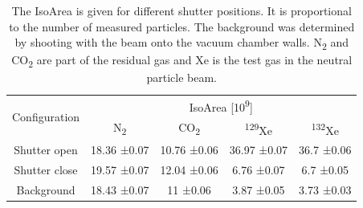 	
	
	\begin{table}
		\begin{center}
			\begin{tabular}{|c|c|c|c|c|}
				\hline
				\multirow{2}{*}{Configuration} & \multicolumn{4}{c|}{IsoArea [10\textsuperscript{9}]} \\
				\cline{2-5}
				&N\textsubscript{2}& CO\textsubscript{2} & \textsuperscript{129}Xe & \textsuperscript{132}Xe \\ \hline
				Shutter open & 18.36 ±0.07 & 10.76 ±0.06 & 36.97 ±0.07 & 36.7 ±0.06\\
				Shutter close & 19.57 ±0.07 & 12.04 ±0.06 &	6.76 ±0.07 & 6.7 ±0.05\\
				Background & 18.43 ±0.07 & 11 ±0.06 & 3.87 ±0.05 & 3.73 ±0.03 \\
				\hline
			\end{tabular}
		\end{center}
		\caption{The IsoArea is given for different shutter positions. It is proportional to the number of measured particles. The background was determined by shooting with the beam onto the vacuum chamber walls. N\textsubscript{2} and CO\textsubscript{2} are part of the residual gas and Xe is the test gas in the neutral particle beam.}
		\label{tab:measShutMot}
	\end{table}
	
